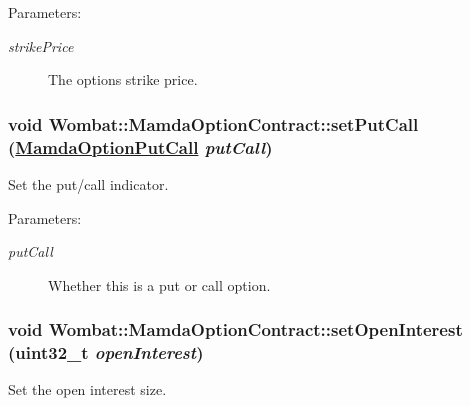 \begin{Desc}
\item[Parameters:]
\begin{description}
\item[{\em strike\-Price}]The options strike price. \end{description}
\end{Desc}
\hypertarget{classWombat_1_1MamdaOptionContract_60c9a0c5d47ac681b3ed1f6bb8a77cb8}{
\subsubsection[setPutCall]{\setlength{\rightskip}{0pt plus 5cm}void Wombat::Mamda\-Option\-Contract::set\-Put\-Call (\hyperlink{namespaceWombat_ceb2ef77ec6c36b48ef57d2887d6ac49}{Mamda\-Option\-Put\-Call} {\em put\-Call})}}
\label{classWombat_1_1MamdaOptionContract_60c9a0c5d47ac681b3ed1f6bb8a77cb8}


Set the put/call indicator. 

\begin{Desc}
\item[Parameters:]
\begin{description}
\item[{\em put\-Call}]Whether this is a put or call option. \end{description}
\end{Desc}
\hypertarget{classWombat_1_1MamdaOptionContract_2a2c8b0bb79e3d20e1065559a763f6c2}{
\subsubsection[setOpenInterest]{\setlength{\rightskip}{0pt plus 5cm}void Wombat::Mamda\-Option\-Contract::set\-Open\-Interest (uint32\_\-t {\em open\-Interest})}}
\label{classWombat_1_1MamdaOptionContract_2a2c8b0bb79e3d20e1065559a763f6c2}


Set the open interest size. 

